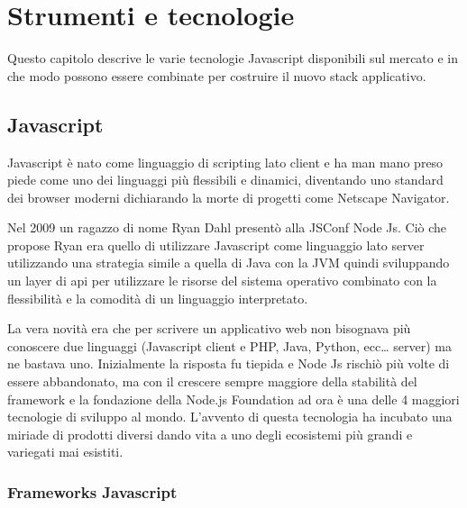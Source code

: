 \chapter{Strumenti e tecnologie}
\label{cha:intro}
\vspace{5mm}
Questo capitolo descrive le varie tecnologie Javascript disponibili sul mercato e in che modo possono essere combinate per costruire il nuovo stack applicativo.

\section{Javascript}\vspace{5mm}

Javascript è nato come linguaggio di scripting lato client e ha man mano preso piede come uno dei linguaggi più flessibili e dinamici, diventando uno standard dei browser moderni dichiarando la morte di progetti come Netscape Navigator.\vspace{5mm}

Nel 2009 un ragazzo di nome Ryan Dahl presentò alla JSConf Node Js. Ciò che propose Ryan era quello di utilizzare Javascript come linguaggio lato server utilizzando una strategia simile a quella di Java con la JVM quindi sviluppando un layer di api per utilizzare le risorse del sistema operativo combinato con la flessibilità e la comodità di un linguaggio interpretato.\vspace{5mm}

La vera novità era che per scrivere un applicativo web non bisognava più conoscere due linguaggi (Javascript client e PHP, Java, Python, ecc… server) ma ne bastava uno. Inizialmente la risposta fu tiepida e Node Js rischiò più volte di essere abbandonato, ma con il crescere sempre maggiore della stabilità del framework e la fondazione della Node.js Foundation ad ora è una delle 4 maggiori tecnologie di sviluppo al mondo. L’avvento di questa tecnologia ha incubato una miriade di prodotti diversi dando vita a uno degli ecosistemi più grandi e variegati mai esistiti.\vspace{5mm}

\subsection{Frameworks Javascript}\vspace{5mm}

